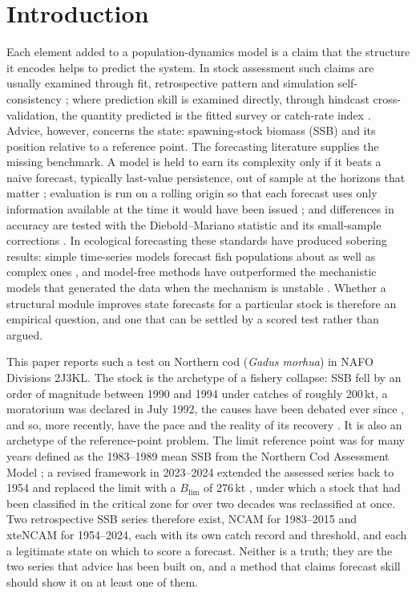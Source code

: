 \documentclass[preprint,11pt,authoryear]{elsarticle}
\theoremstyle{definition}
\theoremstyle{remark}
\newcommand{\Blim}{B_{\mathrm{lim}}}
\begin{document}
\section{Introduction}\label{sec:intro}

Each element added to a population-dynamics model is a claim that the structure it encodes helps to predict the system. In stock assessment such claims are usually examined through fit, retrospective pattern and simulation self-consistency \citep{HilbornWalters1992,Punt2016,Maunder2015}; where prediction skill is examined directly, through hindcast cross-validation, the quantity predicted is the fitted survey or catch-rate index \citep{Kell2016,Kell2021,Carvalho2021,Kokkalis2024}. Advice, however, concerns the state: spawning-stock biomass (SSB) and its position relative to a reference point. The forecasting literature supplies the missing benchmark. A model is held to earn its complexity only if it beats a naive forecast, typically last-value persistence, out of sample at the horizons that matter \citep{Makridakis2000,HyndmanKoehler2006,HyndmanAthanasopoulos2021}; evaluation is run on a rolling origin so that each forecast uses only information available at the time it would have been issued \citep{Tashman2000,Bergmeir2012}; and differences in accuracy are tested with the Diebold--Mariano statistic and its small-sample corrections \citep{Diebold1995,Harvey1997,Diebold2015}. In ecological forecasting these standards have produced sobering results: simple time-series models forecast fish populations about as well as complex ones \citep{Ward2014}, and model-free methods have outperformed the mechanistic models that generated the data when the mechanism is unstable \citep{Perretti2013}. Whether a structural module improves state forecasts for a particular stock is therefore an empirical question, and one that can be settled by a scored test rather than argued.

This paper reports such a test on Northern cod (\emph{Gadus morhua}) in NAFO Divisions 2J3KL. The stock is the archetype of a fishery collapse: SSB fell by an order of magnitude between 1990 and 1994 under catches of roughly 200\,kt, a moratorium was declared in July 1992, the causes have been debated ever since \citep{Hutchings1994,Walters1996,Myers1997,Shelton1999}, and so, more recently, have the pace and the reality of its recovery \citep{RoseRowe2015,RoseWalters2019,Rose2026}. It is also an archetype of the reference-point problem. The limit reference point was for many years defined as the 1983--1989 mean SSB from the Northern Cod Assessment Model \citep[NCAM;][]{Cadigan2016,DFO2016}; a revised framework in 2023--2024 extended the assessed series back to 1954 and replaced the limit with a $\Blim$ of 276\,kt \citep{DFO2024a,DFO2024b,Regular2025}, under which a stock that had been classified in the critical zone for over two decades was reclassified at once. Two retrospective SSB series therefore exist, NCAM for 1983--2015 and xteNCAM for 1954--2024, each with its own catch record and threshold, and each a legitimate state on which to score a forecast. Neither is a truth; they are the two series that advice has been built on, and a method that claims forecast skill should show it on at least one of them.
\end{document}
